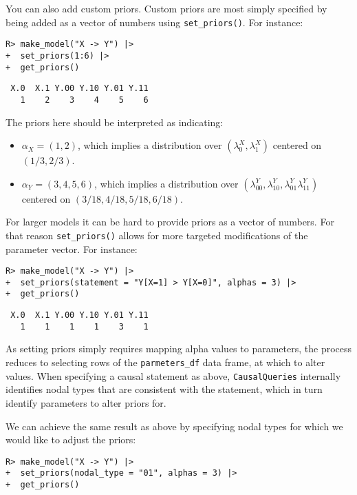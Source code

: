 \documentclass[
  11pt,
  article]{jss}
\providecommand{\tightlist}{%
  \setlength{\itemsep}{0pt}\setlength{\parskip}{0pt}}\usepackage{longtable,booktabs,array}
\begin{document}
You can also add custom priors. Custom priors are most simply specified
by being added as a vector of numbers using \texttt{set\_priors()}. For
instance:

\begin{verbatim}
R> make_model("X -> Y") |> 
+  set_priors(1:6) |> 
+  get_priors()
\end{verbatim}

\begin{verbatim}
 X.0  X.1 Y.00 Y.10 Y.01 Y.11 
   1    2    3    4    5    6 
\end{verbatim}

The priors here should be interpreted as indicating:

\begin{itemize}
\tightlist
\item
  \(\alpha_X = (1,2)\), which implies a distribution over
  \((\lambda^X_0, \lambda^X_1)\) centered on \((1/3, 2/3)\).
\item
  \(\alpha_Y = (3,4,5,6)\), which implies a distribution over
  \((\lambda^Y_{00}, \lambda^Y_{10}, \lambda^Y_{01} \lambda^Y_{11})\)
  centered on \((3/18, 4/18, 5/18, 6/18)\).
\end{itemize}

For larger models it can be hard to provide priors as a vector of
numbers. For that reason \texttt{set\_priors()} allows for more targeted
modifications of the parameter vector. For instance:

\begin{verbatim}
R> make_model("X -> Y") |>
+  set_priors(statement = "Y[X=1] > Y[X=0]", alphas = 3) |>
+  get_priors()
\end{verbatim}

\begin{verbatim}
 X.0  X.1 Y.00 Y.10 Y.01 Y.11 
   1    1    1    1    3    1 
\end{verbatim}

As setting priors simply requires mapping alpha values to parameters,
the process reduces to selecting rows of the \texttt{parmeters\_df} data
frame, at which to alter values. When specifying a causal statement as
above, \texttt{CausalQueries} internally identifies nodal types that are
consistent with the statement, which in turn identify parameters to
alter priors for.

We can achieve the same result as above by specifying nodal types for
which we would like to adjust the priors:

\begin{verbatim}
R> make_model("X -> Y") |>
+  set_priors(nodal_type = "01", alphas = 3) |>
+  get_priors()
\end{verbatim}
\end{document}
